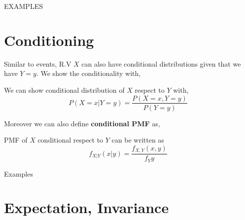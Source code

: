 EXAMPLES \\
\lipsum[1-3]
\section{Conditioning}
Similar to events, R.V $X$ can also have conditional distributions given that we have $Y=y$. We show the conditionality with,
\begin{definition}
    We can show conditional distribution of $X$ respect to $Y$ with,
    \[P(X=x| Y=y) = \frac{ P(X=x,Y=y)}{P(Y=y)} \]
\end{definition}
Moreover we can also define \textbf{conditional PMF} as,
\begin{definition}
    PMF of $X$ conditional respect to $Y$ can be written as 
    \[ f_{X|Y}(x|y)= \frac{f_{X,Y}(x,y)}{f_Y{y}}\]
\end{definition}

Examples \\
\lipsum[1-5]


\section{Expectation, Invariance}
